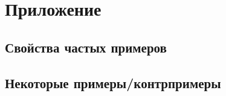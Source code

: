 \section{Приложение}
\subsection{Свойства частых примеров}\label{sec:table_of_examples}


\subsection{Некоторые примеры/контрпримеры}



